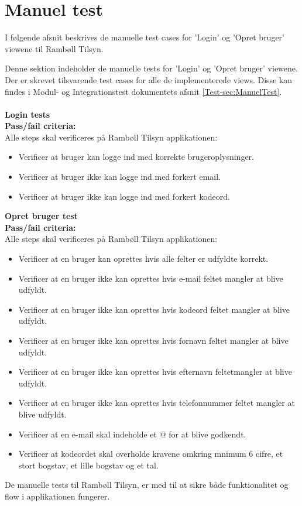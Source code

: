 \clearpage

\section{Manuel test}
I følgende afsnit beskrives de manuelle test cases for 'Login' og 'Opret bruger' viewene til Rambøll Tilsyn.

Denne sektion indeholder de manuelle tests for 'Login' og 'Opret bruger' viewene. Der er skrevet tilsvarende test cases for alle de implementerede views. Disse kan findes i Modul- og Integrationstest dokumentets afsnit \ref{Test-sec:ManuelTest}. \\ \\
\textbf{Login tests} \\
\textbf{Pass/fail criteria:} \\
Alle steps skal verificeres på Rambøll Tilsyn applikationen:
\begin{itemize}[-]
	\item Verificer at bruger kan logge ind med korrekte brugeroplysninger.
	\item Verificer at bruger ikke kan logge ind med forkert email.
	\item Verificer at bruger ikke kan logge ind med forkert kodeord. \\
\end{itemize}

\textbf{Opret bruger test} \\
\textbf{Pass/fail criteria:} \\
Alle steps skal verificeres på Rambøll Tilsyn applikationen:
\begin{itemize}[-]
	\item Verificer at en bruger kan oprettes hvis alle felter er udfyldte korrekt.
	\item Verificer at en bruger ikke kan oprettes hvis e-mail feltet mangler at blive udfyldt.
	\item Verificer at en bruger ikke kan oprettes hvis kodeord feltet mangler at blive udfyldt.
	\item Verificer at en bruger ikke kan oprettes hvis fornavn feltet mangler at blive udfyldt.
	\item Verificer at en bruger ikke kan oprettes hvis efternavn feltetmangler at blive udfyldt.
	\item Verificer at en bruger ikke kan oprettes hvis telefonnummer feltet mangler at blive udfyldt.
	\item Verificer at en e-mail skal indeholde et @ for at blive godkendt.
	\item Verificer at kodeordet skal overholde kravene omkring mnimum 6 cifre, et stort bogstav, et lille bogstav og et tal.
\end{itemize}

De manuelle tests til Rambøll Tilsyn, er med til at sikre både funktionalitet og flow i applikationen fungerer.